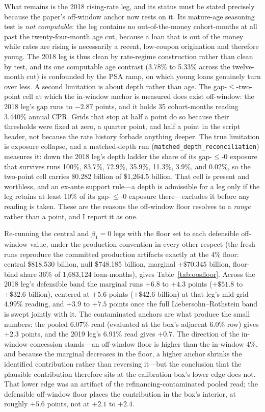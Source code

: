 \documentclass[12pt]{article}
\begin{document}
What remains is the 2018 rising-rate leg, and its status must be stated precisely because the paper's off-window anchor now rests on it. Its mature-age seasoning test is \emph{not computable}: the leg contains no out-of-the-money cohort-months at all past the twenty-four-month age cut, because a loan that is out of the money while rates are rising is necessarily a recent, low-coupon origination and therefore young. The 2018 leg is thus clean by rate-regime construction rather than clean by test, and its one computable age contrast (3.78\% to 5.33\% across the twelve-month cut) is confounded by the PSA ramp, on which young loans genuinely turn over less. A second limitation is about depth rather than age. The gap-$\leq$-two-point cell at which the in-window anchor is measured does exist off-window: the 2018 leg's gap runs to $-2.87$ points, and it holds 35 cohort-months reading 3.440\% annual CPR. Grids that stop at half a point do so because their thresholds were fixed at zero, a quarter point, and half a point in the script header, not because the rate history forbade anything deeper. The true limitation is exposure collapse, and a matched-depth run (\texttt{matched\_depth\_reconciliation}) measures it: down the 2018 leg's depth ladder the share of its gap-$\leq$-0 exposure that survives runs 100\%, 83.7\%, 72.9\%, 35.9\%, 11.3\%, 3.9\%, and 0.02\%, so the two-point cell carries \$0.282 billion of \$1{,}264.5 billion. That cell is present and worthless, and an ex-ante support rule---a depth is admissible for a leg only if the leg retains at least 10\% of its gap-$\leq$-0 exposure there---excludes it before any reading is taken. These are the reasons the off-window floor resolves to a \emph{range} rather than a point, and I report it as one.

Re-running the central and $\beta_1 = 0$ legs with the floor set to each defensible off-window value, under the production convention in every other respect (the fresh runs reproduce the committed production artifacts exactly at the 4\% floor: central \$818.530 billion, null \$748.185 billion, marginal $+\$70.345$ billion, floor-bind share 36\% of 1,683,124 loan-months), gives Table~\ref{tab:oosfloor}. Across the 2018 leg's defensible band the marginal runs $+6.8$ to $+4.3$ points ($+\$51.8$ to $+\$32.6$ billion), centered at $+5.6$ points ($+\$42.6$ billion) at that leg's mid-grid 4.99\% reading, and $+3.9$ to $+7.5$ points once the full Liebersohn--Rothstein band is swept jointly with it. The contaminated anchors are what produce the small numbers: the pooled 6.07\% read (evaluated at the box's adjacent 6.0\% row) gives $+2.3$ points, and the 2019 leg's 6.91\% read gives $+0.7$. The direction of the in-window concession stands---an off-window floor is higher than the in-window 4\%, and because the marginal decreases in the floor, a higher anchor shrinks the identified contribution rather than reversing it---but the conclusion that the plausible contribution therefore sits at the calibration box's lower edge does not. That lower edge was an artifact of the refinancing-contaminated pooled read; the defensible off-window floor places the contribution in the box's interior, at roughly $+5.6$ points, not at $+2.1$ to $+2.4$.
\end{document}
